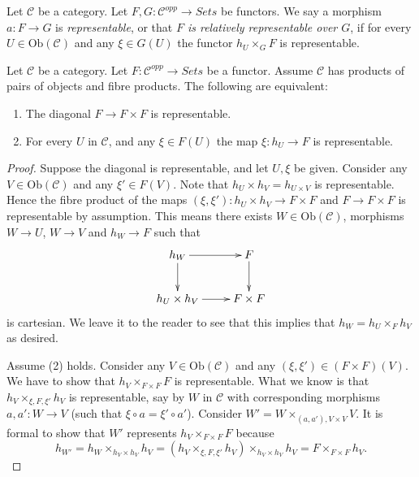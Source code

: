 \begin{definition}
\label{definition-representable-map-presheaves}
Let $\mathcal{C}$ be a category.
Let $F, G : \mathcal{C}^{opp} \to \textit{Sets}$
be functors. We say a morphism $a : F \to G$ is
{\it representable}, or that {\it $F$ is relatively representable
over $G$}, if for every $U \in \text{Ob}(\mathcal{C})$
and any $\xi \in G(U)$ the functor
$h_U \times_G F$ is representable.
\end{definition}

\begin{lemma}
\label{lemma-representable-diagonal}
Let $\mathcal{C}$ be a category.
Let $F : \mathcal{C}^{opp} \to \textit{Sets}$ be a functor.
Assume $\mathcal{C}$ has products of pairs of objects and fibre products.
The following are equivalent:
\begin{enumerate}
\item The diagonal $F \to F \times F$ is representable.
\item For every $U$ in $\mathcal{C}$,
and any $\xi \in F(U)$ the map $\xi : h_U \to F$ is representable.
\end{enumerate}
\end{lemma}

\begin{proof}
Suppose the diagonal is representable, and let $U, \xi$ be given.
Consider any $V \in \text{Ob}(\mathcal{C})$ and any
$\xi' \in F(V)$. Note that $h_U \times h_V = h_{U \times V}$
is representable. Hence the fibre product of the maps
$(\xi, \xi') : h_U \times h_V \to F \times F$
and $F \to F \times F$ is representable by assumption.
This means there exists $W \in \text{Ob}(\mathcal{C})$,
morphisms $W \to U$, $W \to V$ and $h_W \to F$ such that
$$
\xymatrix{
h_{W} \ar[d] \ar[r] & F \ar[d] \\
h_U \times h_V \ar[r] & F \times F
}
$$
is cartesian. We leave it to the reader to see that this
implies that $h_W = h_U \times_F h_V$ as desired.

\medskip\noindent
Assume (2) holds. Consider any $V \in \text{Ob}(\mathcal{C})$
and any $(\xi, \xi') \in (F \times F)(V)$. We have to show that
$h_V \times_{F\times F} F$ is representable. What we know is that
$h_V \times_{\xi, F, \xi'} h_V$ is representable, say by $W$
in $\mathcal{C}$ with corresponding morphisms $a, a' : W \to V$
(such that $\xi \circ a = \xi' \circ a'$).
Consider $W' = W \times_{(a, a'), V\times V} V$.
It is formal to show that $W'$ represents $h_V \times_{F\times F} F$
because
$$
h_{W'} =  h_W \times_{h_V\times h_V} h_V 
= (h_V \times_{\xi, F, \xi'} h_V) \times_{h_V\times h_V} h_V
= F \times_{F \times F} h_V.
$$
\end{proof}










